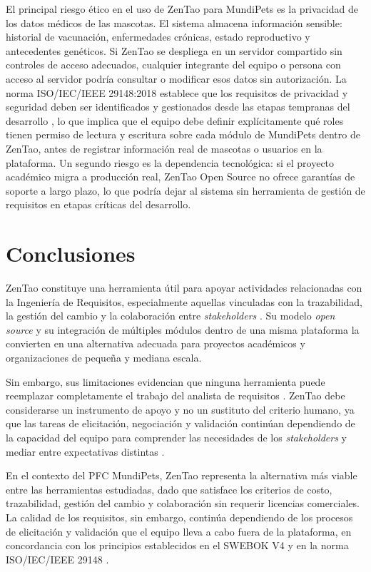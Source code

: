 \documentclass[journal,onecolumn]{IEEEtran}
\begin{document}
El principal riesgo ético en el uso de ZenTao para MundiPets es la privacidad de los datos
médicos de las mascotas. El sistema almacena información sensible: historial de vacunación,
enfermedades crónicas, estado reproductivo y antecedentes genéticos. Si ZenTao se despliega
en un servidor compartido sin controles de acceso adecuados, cualquier integrante del equipo o
persona con acceso al servidor podría consultar o modificar esos datos sin autorización. La norma
ISO/IEC/IEEE 29148:2018 establece que los requisitos de privacidad y seguridad deben ser
identificados y gestionados desde las etapas tempranas del desarrollo \cite{iso29148}, lo que
implica que el equipo debe definir explícitamente qué roles tienen permiso de lectura y escritura
sobre cada módulo de MundiPets dentro de ZenTao, antes de registrar información real de mascotas
o usuarios en la plataforma. Un segundo riesgo es la dependencia tecnológica: si el
proyecto académico migra a producción real, ZenTao Open Source no ofrece garantías de soporte
a largo plazo, lo que podría dejar al sistema sin herramienta de gestión de requisitos en etapas
críticas del desarrollo.

\newpage

\section{Conclusiones}

ZenTao constituye una herramienta útil para apoyar actividades relacionadas con la Ingeniería de
Requisitos, especialmente aquellas vinculadas con la trazabilidad, la gestión del cambio y la
colaboración entre \textit{stakeholders} \cite{zentao2025}. Su modelo \textit{open source} y su
integración de múltiples módulos dentro de una misma plataforma la convierten en una alternativa
adecuada para proyectos académicos y organizaciones de pequeña y mediana escala.

Sin embargo, sus limitaciones evidencian que ninguna herramienta puede reemplazar completamente
el trabajo del analista de requisitos \cite{hussain2022}. ZenTao debe considerarse un instrumento
de apoyo y no un sustituto del criterio humano, ya que las tareas de elicitación, negociación y
validación continúan dependiendo de la capacidad del equipo para comprender las necesidades de los
\textit{stakeholders} y mediar entre expectativas distintas \cite{pohl2015}.

En el contexto del PFC MundiPets, ZenTao representa la alternativa más viable entre las herramientas
estudiadas, dado que satisface los criterios de costo, trazabilidad, gestión del cambio y
colaboración sin requerir licencias comerciales. La calidad de los requisitos, sin embargo,
continúa dependiendo de los procesos de elicitación y validación que el equipo lleva a cabo fuera
de la plataforma, en concordancia con los principios establecidos en el SWEBOK V4 \cite{swebok2024}
y en la norma ISO/IEC/IEEE 29148 \cite{iso29148}.
\end{document}
